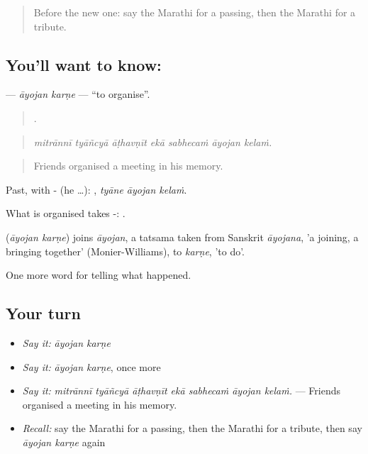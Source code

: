 \label{lesson:MR-C324-ayojan-karne}



\begin{quote}
Before the new one: say the Marathi for a passing, then the Marathi for a tribute.
\end{quote}

\subsection*{You'll want to know:  }
\textbf{ } — \emph{āyojan karṇe} — \textquotedblleft{}to organise\textquotedblright{}.

\begin{quote}
      .
\end{quote}

\begin{quote}
\emph{mitrānnī tyāñcyā āṭhavṇīt ekā sabhecaṁ āyojan kelaṁ.}
\end{quote}

\begin{quote}
Friends organised a meeting in his memory.
\end{quote}

Past, with - (he …):   , \emph{tyāne āyojan kelaṁ}.

What is organised takes -:   .

\begin{cousinweb}
\textbf{ } (\emph{āyojan karṇe}) joins \emph{āyojan}, a tatsama taken from Sanskrit \emph{āyojana}, 'a joining, a bringing together' (Monier-Williams), to \emph{karṇe}, 'to do'.
\end{cousinweb}

\begin{grammarlens}[title={What you've built}]
One more word for telling what happened.
\end{grammarlens}

\subsection*{Your turn}
\begin{itemize}
\raggedright
  \item \emph{Say it:} \emph{āyojan karṇe}
  \item \emph{Say it:} \emph{āyojan karṇe}, once more
  \item \emph{Say it:} \emph{mitrānnī tyāñcyā āṭhavṇīt ekā sabhecaṁ āyojan kelaṁ.} — Friends organised a meeting in his memory.
  \item \emph{Recall:} say the Marathi for a passing, then the Marathi for a tribute, then say \emph{āyojan karṇe} again
\end{itemize}

